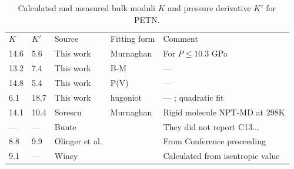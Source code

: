 \documentclass[prb,aps,nobibnotes,twocolumn,doublespace,twocolumngrid,superbib]{revtex4}
\begin{document}
\begin{table}[p]
\begin{center}
\begin{tabular}{lllll}
\hline\hline
$K$ &   $K'$   &   Source  &    Fitting form &      Comment \\
14.6 & 5.6  &  This work &  Murnaghan    &      For $ P \le 10.3 $ GPa \\
13.2 & 7.4  &  This work &  B-M       &                --- \\
14.8 & 5.4  &  This work &  P(V)    &                  --- \\
 6.1 &18.7  &  This work &  hugoniot  &                --- ; quadratic fit \\
14.1 &10.4  &  Sorescu   &  Murnaghan &         Rigid molecule NPT-MD at 298K \\
--- & --- &   Bunte     &         &            They did not report C13... \\
 8.8 & 9.9 &   Olinger et al.& &              From Conference proceeding \\
 9.1 & --- &   Winey     &     &             Calculated from isentropic value \\
\hline\hline
\end{tabular}
\end{center}
\caption{Calculated and measured bulk moduli $K$ and pressure
derivative $K'$ for PETN.
}
\label{tab:table3}
\end{table}

 
\end{document}
